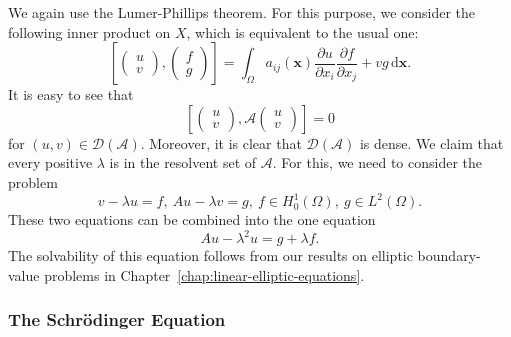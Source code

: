\begin{Proof}
We again use the Lumer-Phillips theorem. For this purpose, we consider the following inner product on $X$, which is equivalent to the usual one:
\begin{equation}\label{eq:semigroup-wave-energy-inner-product}
\left[\begin{pmatrix}u\\v\end{pmatrix},\begin{pmatrix}f\\g\end{pmatrix}\right]=\int_\Omega a_{ij}(\bm{x})\dfrac{\partial u}{\partial x_i}\dfrac{\partial f}{\partial x_j}+vg\,\mathrm{d}\bm{x}.
\end{equation}
It is easy to see that
\begin{equation}\label{eq:semigroup-wave-generator-energy-skew-pairing}
\left[\begin{pmatrix}u\\v\end{pmatrix},\mathcal{A}\begin{pmatrix}u\\v\end{pmatrix}\right]=0
\end{equation}
for $(u,v)\in\mathcal{D}(\mathcal{A})$. Moreover, it is clear that $\mathcal{D}(\mathcal{A})$ is dense. We claim that every positive $\lambda$ is in the resolvent set of $\mathcal{A}$. For this, we need to consider the problem
\begin{equation}\label{eq:semigroup-wave-resolvent-coupled-equations}
v-\lambda u=f,\ Au-\lambda v=g,\ f\in H_0^1(\Omega),\ g\in L^2(\Omega).
\end{equation}
These two equations can be combined into the one equation
\begin{equation}\label{eq:semigroup-wave-resolvent-reduced-elliptic-equation}
Au-\lambda^2u=g+\lambda f.
\end{equation}
The solvability of this equation follows from our results on elliptic boundary-value problems in Chapter~\ref{chap:linear-elliptic-equations}.
\end{Proof}

\subsubsection{The Schrödinger Equation}\label{subsec:semigroup-schrodinger-equation}

